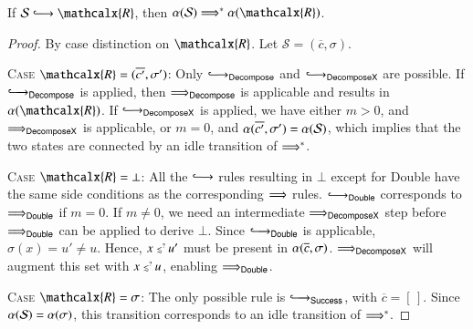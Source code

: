 \begin{lemma}\label{lemma:ehoh:match-refinement}
  If $\mathcal{S} \Matchiiarrow \mathcalx{R}$,
  then $\AlphaMatch{\mathcal{S}} \Matcharrow^* \AlphaMatch{\mathcalx{R}}$.
\end{lemma}
\begin{proof}
By case distinction on $\mathcalx{R}$. Let $\mathcal{S} = (\overline{c}, \sigma)$.

\medskip

\begin{sloppypar}%
  \noindent
  \textsc{Case} $\mathcalx{R} = (\overline{c'}, \sigma')$:\enskip
  Only $\Matchiiarrow_{\mathsf{Decompose}}$ and
  $\Matchiiarrow_{\mathsf{DecomposeX}}$ are possible.
  If $\Matchiiarrow_{\mathsf{Decompose}}$ is applied, then $\Longrightarrow_{\mathsf{Decompose}}$
  is applicable and results in $\AlphaMatch{\mathcalx{R}}$.
  If $\Matchiiarrow_{\mathsf{DecomposeX}}$ is applied,
  we have either $m>0$, and $\Longrightarrow_{\mathsf{DecomposeX}}$ is applicable,
  or $m = 0$, and $\alpha(\overline{c'},\sigma') = \alpha(\mathcal{S})$,
  which implies that the two states are connected by an idle transition of
  $\Longrightarrow^*$.
  \end{sloppypar}
  
  \medskip
  
  \noindent
  \textsc{Case} $\mathcalx{R} = \bot$:\enskip
  All the $\Matchiiarrow$ rules resulting in $\bot$ except for \textsf{Double}
  have the same side conditions as the corresponding $\Longrightarrow$ rules.
  $\Matchiiarrow_{\mathsf{Double}}$ corresponds to
  $\Longrightarrow_{\mathsf{Double}}$ if $m=0$. If $m \neq 0$, we need
  an intermediate $\Longrightarrow_{\mathsf{DecomposeX}}$ step before
  $\Longrightarrow_{\mathsf{Double}}$ can be applied to derive $\bot$. Since
  $\Matchiiarrow_{\mathsf{Double}}$ is applicable, $\sigma(x) = u'
  \neq u$. Hence, $x \mathrel{{\scriptstyle\lesssim}^{\scriptscriptstyle{?\!}}} u'$ must be present in $\alpha(\overline{c},
  \sigma)$. $\Longrightarrow_{\mathsf{DecomposeX}}$ will augment this set with
  $x \mathrel{{\scriptstyle\lesssim}^{\scriptscriptstyle{?\!}}} u$, enabling $\Longrightarrow_{\mathsf{Double}}$.
  
  \medskip
  
  \noindent
  \textsc{Case} $\mathcalx{R} = \sigma$:\enskip
  The only possible rule is $\Matchiiarrow_{\mathsf{Success}}$,
  with $\overline{c}=[\,]$. Since $\alpha(\mathcal{S}) = \alpha(\sigma)$,
  this transition corresponds to an idle transition of $\Longrightarrow^*$.
\end{proof}

